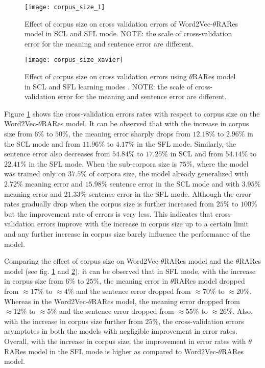 \begin{figure}[hbtp]
\centering
\texttt{[image: corpus\_size\_1]}
\caption[Effect of corpus size on Word2Vec-$\theta$RARes model.]{Effect of corpus size on cross validation errors of Word2Vec-$\theta$RARes model in SCL and SFL mode. NOTE: the scale of cross-validation error for the meaning and sentence error are different.}
\label{fig:corpus_size_1}
\end{figure}

\begin{figure}[hbtp]
\centering
\texttt{[image: corpus\_size\_xavier]}
\caption[Effect of corpous size on $\theta$RARes model.]{Effect of corpus size on cross validation errors using $\theta$RARes model in SCL and SFL learning modes \cite{xavier:2013:RT}. NOTE: the scale of cross-validation error for the meaning and sentence error are different.}
\label{fig:corpus_size_xavier}
\end{figure}

Figure \ref{fig:corpus_size_1} shows the cross-validation errors rates with respect to corpus size on the Word2Vec-$\theta$RARes model. It can be observed that with the increase in corpus size from $6 \%$  to $50 \%$, the meaning error sharply drops from $12.18 \%$ to $2.96 \%$ in the SCL mode and from $11.96\%$ to $4.17 \%$ in the SFL mode. Similarly, the sentence error also decreases from $54.84 \%$ to $17.25 \%$ in SCL and from $54.14 \%$ to $22.41 \%$ in the SFL mode. When the sub-corpora size is $75\%$, where the model was trained only on $37.5\%$ of corpora size, the model already generalized with $2.72 \%$ meaning error and $15.98 \%$ sentence error in the SCL mode and with $3.95 \%$ meaning error and $21.33 \%$ sentence error in the SFL mode. Although the error rates gradually drop when the corpus size is further increased from $25\%$ to $100\%$ but the improvement rate of errors is very less. This indicates that cross-validation errors improve with the increase in corpus size up to a certain limit and any further increase in corpus size barely influence the performance of the model.

Comparing the effect of corpus size on Word2Vec-$\theta$RARes model and the $\theta$RARes model (see fig. \ref{fig:corpus_size_1} and \ref{fig:corpus_size_xavier}), it can be observed that in SFL mode, with the increase in corpus size from $6\%$ to $25\%$, the meaning error in $\theta$RARes model dropped from $\approx 17\%$ to $\approx 4\%$ and the sentence error dropped from $\approx 70\%$ to $\approx 20\%$. Whereas in the Word2Vec-$\theta$RARes model, the meaning error dropped from $\approx 12\%$ to $\approx 5\%$ and the sentence error dropped from $\approx 55\%$ to $\approx 26\%$. Also, with the increase in corpus size further from $25 \%$, the cross-validation errors asymptotes in both the models with negligible improvement in error rates. Overall, with the increase in corpus size, the improvement in error rates with $\theta$RARes model in the SFL mode is higher as compared to Word2Vec-$\theta$RARes model.


